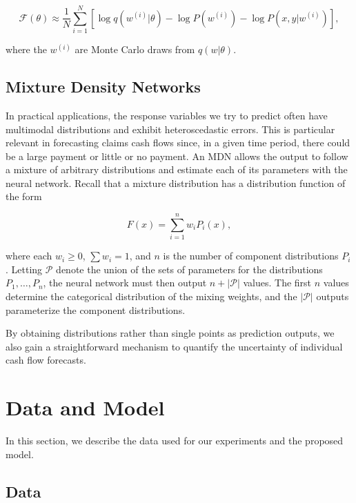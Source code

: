 \documentclass{article}
\begin{document}
\begin{equation}
    \mathcal{F}(\theta) \approx \frac{1}{N} \sum_{i=1}^N [\log q(w^{(i)}|\theta) - \log P(w^{(i)}) - \log P(x, y|w^{(i)})],
\end{equation}

where the $w^{(i)}$ are Monte Carlo draws from $q(w|\theta)$.

\subsection{Mixture Density Networks}

In practical applications, the response variables we try to predict often have multimodal distributions and exhibit heteroscedastic errors. This is particular relevant in forecasting claims cash flows since, in a given time period, there could be a large payment or little or no payment. An MDN allows the output to follow a mixture of arbitrary distributions and estimate each of its parameters with the neural network. Recall that a mixture distribution has a distribution function of the form

\begin{equation}
    F(x) = \sum_{i = 1}^n w_i P_i(x),
\end{equation}

where each $w_i \geq 0$, $\sum w_i = 1$, and $n$ is the number of component distributions $P_i$. Letting $\mathcal{P}$ denote the union of the sets of parameters for the distributions $P_1, \dots, P_n$, the neural network must then output $n + |\mathcal{P}|$ values. The first $n$ values determine the categorical distribution of the mixing weights, and the $|\mathcal{P}|$ outputs parameterize the component distributions.

By obtaining distributions rather than single points as prediction outputs, we also gain a straightforward mechanism to quantify the uncertainty of individual cash flow forecasts.

\section{Data and Model}

In this section, we describe the data used for our experiments and the proposed model.

\subsection{Data}
\end{document}
